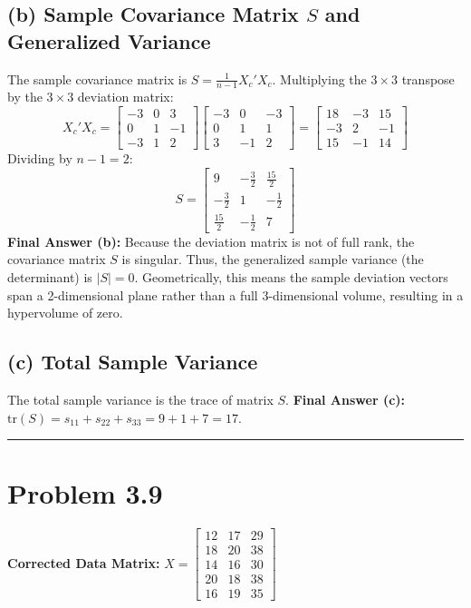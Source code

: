 \documentclass[12pt]{article}
\begin{document}
\subsection*{(b) Sample Covariance Matrix $S$ and Generalized Variance}
The sample covariance matrix is $S = \frac{1}{n-1} X_c' X_c$. Multiplying the $3 \times 3$ transpose by the $3 \times 3$ deviation matrix:
$$ X_c' X_c = \begin{bmatrix} -3 & 0 & 3 \\ 0 & 1 & -1 \\ -3 & 1 & 2 \end{bmatrix} \begin{bmatrix} -3 & 0 & -3 \\ 0 & 1 & 1 \\ 3 & -1 & 2 \end{bmatrix} = \begin{bmatrix} 18 & -3 & 15 \\ -3 & 2 & -1 \\ 15 & -1 & 14 \end{bmatrix} $$
Dividing by $n-1 = 2$:
$$ S = \begin{bmatrix} 9 & -\frac{3}{2} & \frac{15}{2} \\ -\frac{3}{2} & 1 & -\frac{1}{2} \\ \frac{15}{2} & -\frac{1}{2} & 7 \end{bmatrix} $$
\textbf{Final Answer (b):} Because the deviation matrix is not of full rank, the covariance matrix $S$ is singular. Thus, the generalized sample variance (the determinant) is $|S| = 0$. Geometrically, this means the sample deviation vectors span a 2-dimensional plane rather than a full 3-dimensional volume, resulting in a hypervolume of zero.

\subsection*{(c) Total Sample Variance}
The total sample variance is the trace of matrix $S$.
\textbf{Final Answer (c):} $\text{tr}(S) = s_{11} + s_{22} + s_{33} = 9 + 1 + 7 = 17$.

\rule{\textwidth}{0.4pt}

\section*{Problem 3.9}

\textbf{Corrected Data Matrix:} $X = \begin{bmatrix} 12 & 17 & 29 \\ 18 & 20 & 38 \\ 14 & 16 & 30 \\ 20 & 18 & 38 \\ 16 & 19 & 35 \end{bmatrix}$
\end{document}
